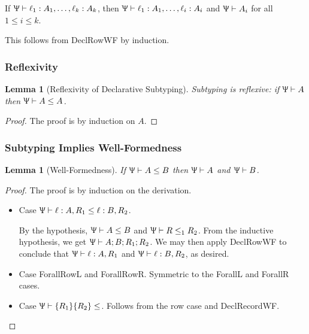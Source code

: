 \documentclass{article}
\newtheorem{lem}[thm]{Lemma}
\newenvironment{manuallemma}[1]{%
  \renewcommand\themanuallemmainner{#1}%
  \manuallemmainner
}{\endmanuallemmainner}
\newcommand{\declCtx}{\Uppsi}
\newcommand{\rcd}[1]{\{#1\}}
\newcommand{\rowall}{\rotatebox[origin=c]{180}{\(\mathsf{R}\)}}
\newcommand{\rowvar}{\alpha_\rho}
\newcommand{\wf}[2]{#1 \vdash #2}
\newcommand{\subtypes}[3]{#1 \vdash #2 \le #3}
\begin{document}
\begin{manuallemma}{2.5}[Row Formedness]
  If \(\wf \declCtx {\ell_1 : A_1, \dots, \ell_k : A_k}\), then \(\wf \declCtx
  {\ell_1 : A_1, \dots, \ell_i : A_i}\) and \(\wf \declCtx A_i\) for all \(1 \le
  i \le k\).
\end{manuallemma}

This follows from DeclRowWF by induction.

\subsubsection{Reflexivity}
\begin{lem}[Reflexivity of Declarative Subtyping]
  Subtyping is reflexive: if \(\wf \declCtx A \) then \(\subtypes \declCtx A
  A\).
\end{lem}

\begin{proof}
The proof is by induction on \(A\).

  
\end{proof}

\subsubsection{Subtyping Implies Well-Formedness}

\begin{lem}[Well-Formedness]
  If \(\subtypes \declCtx A B\) then \(\wf \declCtx A\) and \(\wf \declCtx B\).
\end{lem}

\begin{proof}
  The proof is by induction on the derivation.
  \begin{itemize}
  \item Case \(\subtypes \declCtx {\ell : A, R_1} {\ell : B, R_2}\).

    By the hypothesis, \(\subtypes \declCtx A B\) and \(\subtypes \declCtx R_1
    R_2\). From the inductive hypothesis, we get \(\wf \declCtx {A; B; R_1;
      R_2}\). We may then apply DeclRowWF to conclude that \(\wf \declCtx {\ell
      : A, R_1}\) and \(\wf \declCtx {\ell : B, R_2}\), as desired.
  \item Case ForallRowL and ForallRowR. Symmetric to the ForallL and ForallR
    cases.
  \item Case \(\subtypes \declCtx {\rcd{R_1} {\rcd{R_2}}}\). Follows from the
    row case and DeclRecordWF.
  \end{itemize}
\end{proof}
\end{document}
